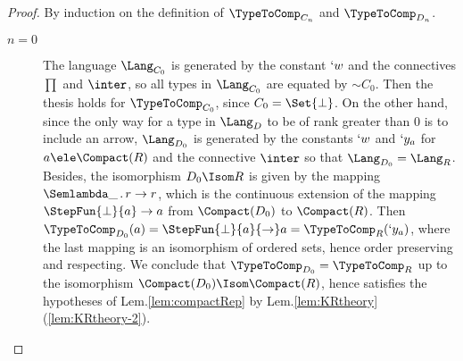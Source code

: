 \documentclass{CSML}
\begin{document}
 \begin{proof}
By induction on the definition of $\TypeToComp_{C_n}$ and $ \TypeToComp_{D_n}$. 

 \begin{description}

 \item[$n=0$]
The language $\Lang_{C_0}$ is generated by the constant $`w$ and the connectives $\prod $ and $\inter$, so all types in $\Lang_{C_0}$ are equated by $\sim{C_0}$. Then the thesis holds for $\TypeToComp_{C_0}$, since $C_0=\Set{\bot}$. 
On the other hand, since the only way for a type in $\Lang_D$ to be of rank greater than $0$ is to include an arrow, $\Lang_{D_0}$ is generated by the constants $`w$ and $`y_a$ for $a \ele \Compact(R)$ and the connective $\inter$ so that $\Lang_{D_0} = \Lang_R$. 
Besides, the isomorphism $D_0 \Isom R$ is given by the mapping $\Semlambda \_ \, . \, r \to r$, which is the continuous extension of the mapping $\StepFun{\bot }{ a} \to a$ from $\Compact(D_0)$ to $\Compact(R)$. 
Then $\TypeToComp_{D_0}(a) = \StepFun{\bot }{ a} { \to} a = \TypeToComp_R(`y_a)$, 
where the last mapping is an isomorphism of ordered sets, hence order preserving and respecting.
We conclude that $\TypeToComp_{D_0} = \TypeToComp_{R}$ up to the isomorphism $\Compact(D_0) \Isom \Compact(R)$, hence satisfies the hypotheses of Lem.\skp\ref{lem:compactRep} by Lem.\skp\ref{lem:KRtheory}\,(\ref{lem:KRtheory-2}).


\end{description}
\end{proof}
\end{document}
